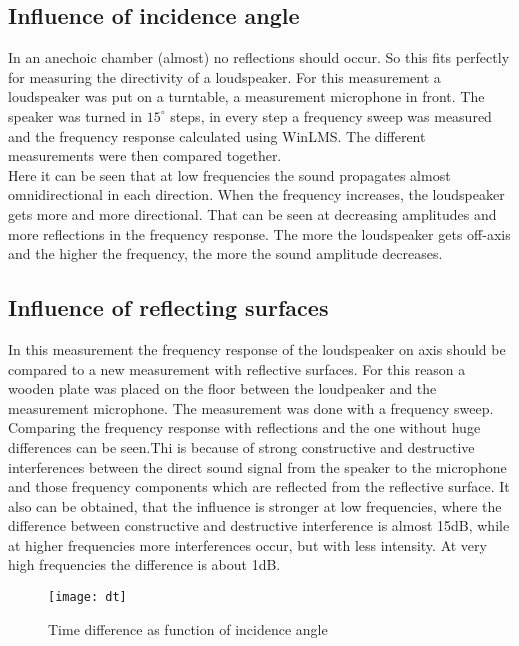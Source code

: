 \documentclass{article}
\begin{document}
\subsection{Influence of incidence angle}
In an anechoic chamber (almost) no reflections should occur. So this fits perfectly for measuring the directivity of a loudspeaker. For this measurement a loudspeaker was put on a turntable, a measurement microphone in front. The speaker was turned in $15^\circ$ steps, in every step a frequency sweep was measured and the frequency response calculated using WinLMS. The different measurements were then compared together.\\
Here it can be seen that at low frequencies the sound propagates almost omnidirectional in each direction. When the frequency increases, the loudspeaker gets more and more directional. That can be seen at decreasing amplitudes and more reflections in the frequency response. The more the loudspeaker gets off-axis and the higher the frequency, the more the sound amplitude decreases.
\subsection{Influence of reflecting surfaces}
In this measurement the frequency response of the loudspeaker on axis should be compared to a new measurement with reflective surfaces. For this reason a wooden plate was placed on the floor between the loudpeaker and the measurement microphone. The measurement was done with a frequency sweep. Comparing the frequency response with reflections and the one without huge differences can be seen.Thi is because of strong constructive and destructive interferences between the direct sound signal from the speaker to the microphone and those frequency components which are reflected from the reflective surface.  It also can be obtained, that the influence is stronger at low frequencies, where the difference between constructive and destructive interference is almost 15dB, while at higher frequencies more interferences occur, but with less intensity. At very high frequencies the difference is about 1dB.
\begin{figure}[htbp]
\begin{center}
\texttt{[image: dt]}
\caption{Time difference as function of incidence angle}
\label{fig:dt}
\end{center}
\end{figure}



\newpage
\end{document}
